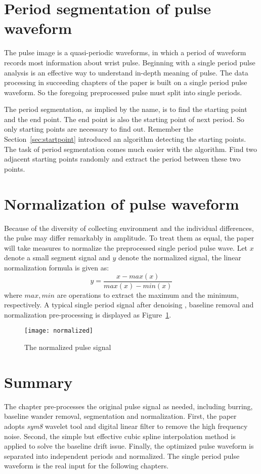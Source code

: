 \section{Period segmentation of pulse waveform}
The pulse image is a quasi-periodic waveforms, in which a period of
waveform records most information about wrist pulse. Beginning
with a single period pulse analysis is an effective way to understand 
in-depth meaning of pulse. The data processing in succeeding chapters
of the paper is built on a single period pulse waveform. So the
foregoing preprocessed pulse must split into single periods. 

The period segmentation, as implied by the name, is to find the starting
point and the end point. The end point is also the starting point of
next period. So only starting points are necessary to find out.
Remember the Section~\ref{sec:startpoint} introduced an algorithm
detecting the starting points. The task of period segmentation comes
much easier with the algorithm. Find two adjacent starting points
randomly and extract the period between these two points.

\section{Normalization of pulse waveform }
Because of the diversity of collecting environment and the individual
differences, the pulse may differ remarkably in amplitude. To treat them
as equal, the paper will take measures to normalize the preprocessed single
period pulse wave. Let $x$ denote a small segment signal and 
$y$ denote the normalized signal,  the
linear normalization formula is given as:
\begin{equation}
    y = \frac{x-max(x)}{max(x)-min(x)}
    \label{equ:normalize}
\end{equation}
where $max,min$ are operations to extract the maximum and the minimum,
respectively. A typical single period signal after denoising
, baseline removal and normalization pre-processing is displayed as
Figure~\ref{fig:normalize}.
\begin{figure}[htpb]
    \begin{center}
        \texttt{[image: normalized]}
    \end{center}
    \caption{The normalized pulse signal}
    \label{fig:normalize}
\end{figure}


\section{Summary}
The chapter pre-processes the original pulse signal as needed,
including burring, baseline wander removal, segmentation and
normalization. First, the paper adopts \emph{sym8} wavelet tool and
digital linear filter to remove the high frequency noise. Second,
the simple but effective cubic spline interpolation method is applied to solve the baseline
drift issue. Finally, the optimized pulse waveform is separated into
independent periods and normalized. The single period pulse waveform
is the real input for the following chapters. 

